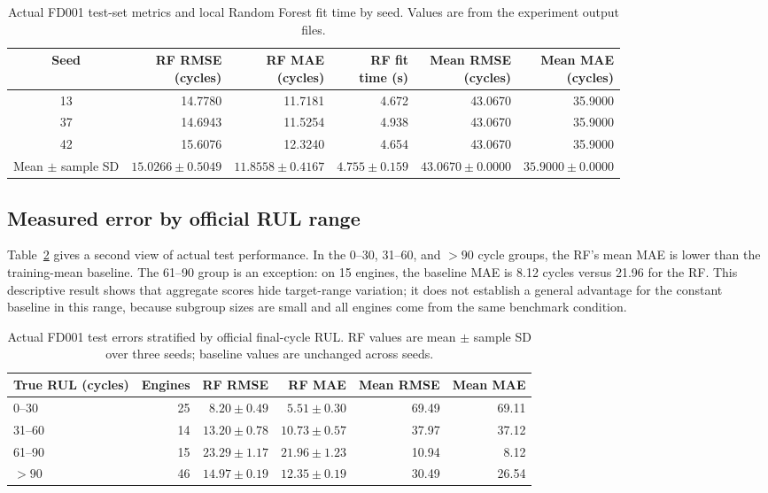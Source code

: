 ﻿\documentclass[conference]{IEEEtran}
\begin{document}
\begin{table}[t]
\caption{Actual FD001 test-set metrics and local Random Forest fit time by seed. Values are from the experiment output files.}
\label{tab:seedresults}
\centering
\scriptsize
\setlength{\tabcolsep}{3.5pt}
\begin{tabular}{crrrr r}
\toprule
Seed & \shortstack{RF RMSE\\(cycles)} & \shortstack{RF MAE\\(cycles)} & \shortstack{RF fit\\time (s)} & \shortstack{Mean RMSE\\(cycles)} & \shortstack{Mean MAE\\(cycles)} \\
\midrule
13 & 14.7780 & 11.7181 & 4.672 & 43.0670 & 35.9000 \\
37 & 14.6943 & 11.5254 & 4.938 & 43.0670 & 35.9000 \\
42 & 15.6076 & 12.3240 & 4.654 & 43.0670 & 35.9000 \\
\midrule
Mean $\pm$ sample SD & $15.0266\pm0.5049$ & $11.8558\pm0.4167$ & $4.755\pm0.159$ & $43.0670\pm0.0000$ & $35.9000\pm0.0000$ \\
\bottomrule
\end{tabular}
\end{table}

\subsection{Measured error by official RUL range}
Table~\ref{tab:rulrange} gives a second view of actual test performance. In the 0--30, 31--60, and $>90$ cycle groups, the RF's mean MAE is lower than the training-mean baseline. The 61--90 group is an exception: on 15 engines, the baseline MAE is 8.12 cycles versus 21.96 for the RF. This descriptive result shows that aggregate scores hide target-range variation; it does not establish a general advantage for the constant baseline in this range, because subgroup sizes are small and all engines come from the same benchmark condition.

\begin{table}[t]
\caption{Actual FD001 test errors stratified by official final-cycle RUL. RF values are mean $\pm$ sample SD over three seeds; baseline values are unchanged across seeds.}
\label{tab:rulrange}
\centering
\scriptsize
\setlength{\tabcolsep}{3pt}
\begin{tabular}{lrrrrr}
\toprule
True RUL (cycles) & Engines & RF RMSE & RF MAE & Mean RMSE & Mean MAE \\
\midrule
0--30 & 25 & $8.20\pm0.49$ & $5.51\pm0.30$ & 69.49 & 69.11 \\
31--60 & 14 & $13.20\pm0.78$ & $10.73\pm0.57$ & 37.97 & 37.12 \\
61--90 & 15 & $23.29\pm1.17$ & $21.96\pm1.23$ & 10.94 & 8.12 \\
$>90$ & 46 & $14.97\pm0.19$ & $12.35\pm0.19$ & 30.49 & 26.54 \\
\bottomrule
\end{tabular}
\end{table}
\end{document}
